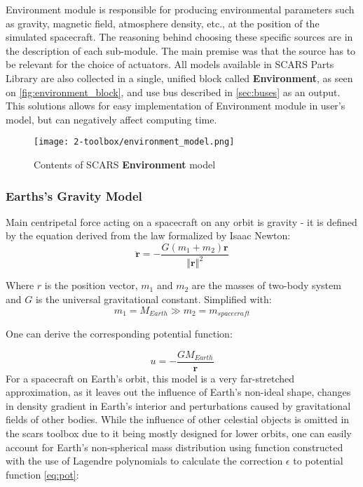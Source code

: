     Environment module is responsible for producing environmental parameters such as gravity, magnetic field, atmosphere density, etc., at the position of the simulated spacecraft. The reasoning behind choosing these specific sources are in the description of each sub-module. The main premise was that the source has to be relevant for the choice of actuators. All models available in SCARS Parts Library are also collected in a single, unified block called \textbf{Environment}, as seen on \autoref{fig:environment_block}, and use bus described in \autoref{sec:buses} as an output. This solutions allows for easy implementation of Environment module in user's model, but can negatively affect computing time.

    \begin{figure}[H]
        \centering
        \texttt{[image: 2-toolbox/environment\_model.png]}
        \caption{Contents of SCARS \textbf{Environment} model}
        \label{fig:environment_block}
    \end{figure}

        
    \subsubsection{Earths's Gravity Model}
        Main centripetal force acting on a spacecraft on any orbit is gravity - it is defined by the equation derived from the law formalized by Isaac Newton:
        \begin{equation}
            \ddot{\textbf{r}} = -\frac{G(m_1+m_2)\textbf{r}}{\left\Vert \textbf{r} \right\Vert^2}
        \end{equation}

        Where $r$ is the position vector, $m_1$ and $m_2$ are the masses of two-body system and $G$ is the universal gravitational constant. Simplified with:
        \begin{equation}
            m_1 = M_{Earth} \gg m_2 = m_{spacecraft}
        \end{equation}

        One can derive the corresponding potential function:
        
        \begin{equation}
            u = -\frac{GM_{Earth}}{\textbf{r}}\label{eq:pot}
        \end{equation}
        For a spacecraft on Earth's orbit, this model is a very far-stretched approximation, as it leaves out the influence of Earth's non-ideal shape, changes in density gradient in Earth's interior and perturbations caused by gravitational fields of other bodies. While the influence of other celestial objects is omitted in the \ac{scars} toolbox due to it being mostly designed for lower orbits, one can easily account for Earth's non-spherical mass distribution using function constructed with the use of Lagendre polynomials to calculate the correction $\epsilon$ to potential function \eqref{eq:pot}:

